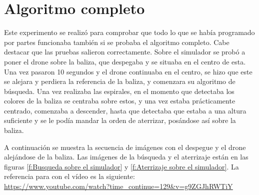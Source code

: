 \section{Algoritmo completo}\label{sec.algoritmocompleto}
\hspace{1cm} Este experimento se realiz\'o para comprobar que todo lo que se hab\'ia programado por partes funcionaba tambi\'en si se probaba el algoritmo completo. Cabe destacar que las pruebas salieron correctamente. Sobre el simulador se prob\'o a poner el drone sobre la baliza, que despegaba y se situaba en el centro de esta. Una vez pasaron 10 segundos y el drone continuaba en el centro, se hizo que este se alejara y perdiera la referencia de la baliza, y comenzara su algoritmo de b\'usqueda. Una vez realizaba las espirales, en el momento que detectaba los colores de la baliza se centraba sobre estos, y una vez estaba pr\'acticamente centrado, comenzaba a descender, hasta que detectaba que estaba a una altura suficiente y se le pod\'ia mandar la orden de aterrizar, pos\'andose as\'i sobre la baliza. 

A continuaci\'on se muestra la secuencia de im\'agenes con el despegue y el drone alej\'andose de la baliza. Las im\'agenes de la b\'usqueda y el aterrizaje est\'an en las figuras \ref{f:Busqueda sobre el simulador} y \ref{f:Aterrizaje sobre el simulador}. La referencia para con el v\'ideo es la siguiente:\\
\underline{\url{https://www.youtube.com/watch?time_continue=129&v=g9ZGJhRWTiY}}

